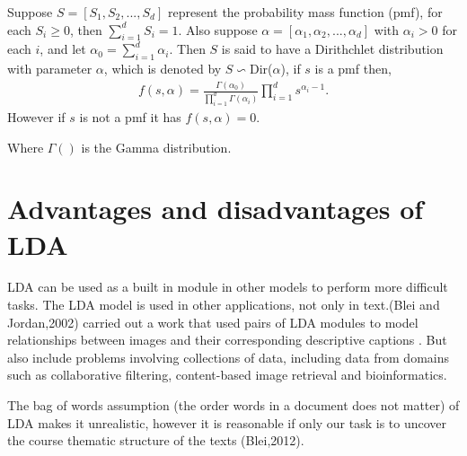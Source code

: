 Suppose $S=[S_1,S_2,...,S_d] $  represent the  probability mass function (pmf), for each $S_i\geq 0$, then $\sum _{i=1}^{d}S_i=1$. Also suppose $\alpha=[\alpha_1,\alpha_2,...,\alpha_d]$ with $\alpha_i>0$ for each $i$, and let $\alpha_0=\sum _{i=1}^{d}\alpha_i$. Then $S$ is said to have a Dirithchlet distribution with parameter $\alpha$, which is denoted by $S \backsim $Dir($\alpha$), if $s$ is a  pmf then,
\begin{align}
f(s,\alpha)=\frac{\Gamma(\alpha_0)}{\prod_{i=1}^{d}\Gamma(\alpha_i)}\prod_{i=1}^{d}s^{\alpha_i -1}.
\end{align}
However if $s$ is not a pmf  it has $f(s,\alpha)=0\text{.}$

Where $\Gamma()$ is the Gamma distribution.
\section{Advantages and disadvantages of LDA} 
LDA can be used as a built in module in other models to perform more difficult tasks.
The LDA model is used in other applications, not only in text.(Blei and Jordan,2002) carried out a  work that used pairs of LDA modules to
model relationships between images and their corresponding descriptive captions .
But also include problems involving collections of data, including data from domains such as collaborative filtering,
content-based image retrieval and bioinformatics.
\begin{flushleft}
The bag of words assumption (the order words in a document does not matter) of LDA makes it unrealistic, however it is reasonable if only our task is to uncover the course thematic structure of the texts (Blei,2012).
\end{flushleft}
